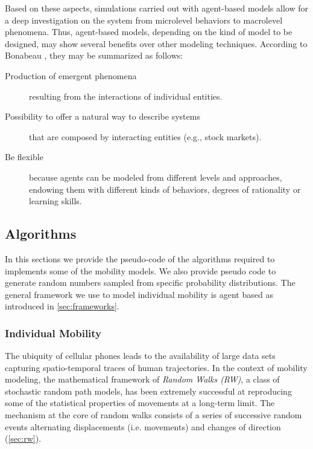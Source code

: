  Based on these aspects, simulations carried out with agent-based models allow for a deep investigation on the system from microlevel behaviors to macrolevel phenomena. Thus, agent-based models, depending on the kind of model to be designed, may show several benefits over other modeling techniques. According to Bonabeau \cite{bonabeau_2002_agent}, they may be summarized as follows: 
 \begin{description}
 	\item[Production of emergent phenomena] resulting from the interactions of individual entities. 
 	\item[Possibility to offer a natural way to describe systems] that are composed by interacting entities (e.g., stock markets).
 	\item[Be flexible] because agents can be modeled from different levels and approaches, endowing them with different kinds of behaviors, degrees of rationality  or learning skills.
 \end{description}




\subsection{Algorithms}
\label{sec:algo}

In this sections we provide the pseudo-code of the algorithms required to implements some of the mobility models. We also provide pseudo code to generate random numbers sampled from specific probability distributions. The general framework we use to model individual mobility is agent based as introduced in \sectionname\ref{sec:frameworks}.

\subsubsection{Individual Mobility}
 The ubiquity of cellular phones leads to the availability of large data sets capturing spatio-temporal traces of human trajectories. In the context of mobility modeling, the mathematical framework of \emph{Random Walks (RW)}, a class of stochastic random path models, has been extremely successful at reproducing some of the statistical properties of movements at a long-term limit. The mechanism at the core of random walks consists of a series of successive random events alternating displacements (i.e. movements) and changes of direction (\sectionname\ref{sec:rw}).
 
